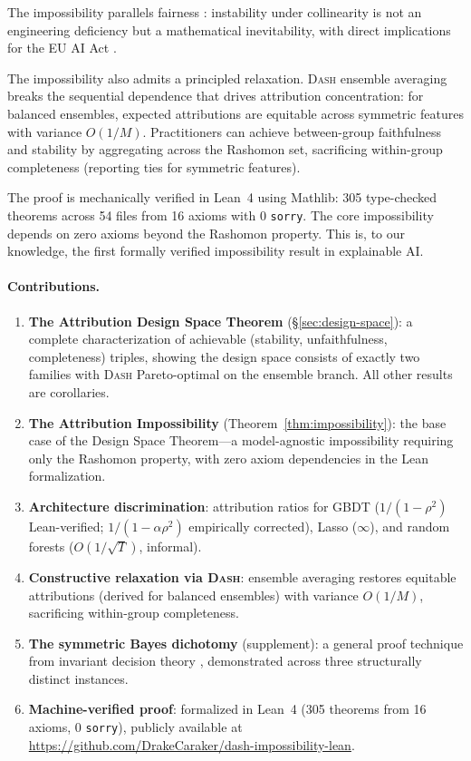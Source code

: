 \documentclass{article}
\newcommand{\DASH}{\textsc{Dash}}
\newcommand{\GBDT}{\textsc{GBDT}}
\begin{document}
The impossibility parallels fairness \citep{chouldechova2017fair,kleinberg2017inherent}: instability under collinearity is not an engineering deficiency but a mathematical inevitability, with direct implications for the EU AI Act \citep{euaiact2024}.

The impossibility also admits a principled relaxation.
\DASH{} ensemble averaging breaks the sequential dependence that drives attribution concentration: for balanced ensembles, expected attributions are equitable across symmetric features with variance $O(1/M)$.
Practitioners can achieve between-group faithfulness and stability by aggregating across the Rashomon set, sacrificing within-group completeness (reporting ties for symmetric features).

The proof is mechanically verified in Lean~4 using Mathlib: 305 type-checked theorems across 54 files from 16 axioms with 0 \texttt{sorry}.
The core impossibility depends on zero axioms beyond the Rashomon property.
This is, to our knowledge, the first formally verified impossibility result in explainable AI.

\paragraph{Contributions.}
\begin{enumerate}
    \item \textbf{The Attribution Design Space Theorem} (\S\ref{sec:design-space}): a complete characterization of achievable (stability, unfaithfulness, completeness) triples, showing the design space consists of exactly two families with \DASH{} Pareto-optimal on the ensemble branch. All other results are corollaries.
    \item \textbf{The Attribution Impossibility} (Theorem~\ref{thm:impossibility}): the base case of the Design Space Theorem---a model-agnostic impossibility requiring only the Rashomon property, with zero axiom dependencies in the Lean formalization.
    \item \textbf{Architecture discrimination}: attribution ratios for \GBDT{} ($1/(1{-}\rho^2)$ Lean-verified; $1/(1{-}\alpha\rho^2)$ empirically corrected), Lasso ($\infty$), and random forests ($O(1/\sqrt{T})$, informal).
    \item \textbf{Constructive relaxation via \DASH{}}: ensemble averaging restores equitable attributions (derived for balanced ensembles) with variance $O(1/M)$, sacrificing within-group completeness.
    \item \textbf{The symmetric Bayes dichotomy} (supplement): a general proof technique from invariant decision theory \citep{lehmann2005testing}, demonstrated across three structurally distinct instances.
    \item \textbf{Machine-verified proof}: formalized in Lean~4 (305 theorems from 16 axioms, 0 \texttt{sorry}), publicly available at \url{https://github.com/DrakeCaraker/dash-impossibility-lean}.
\end{enumerate}
\end{document}
